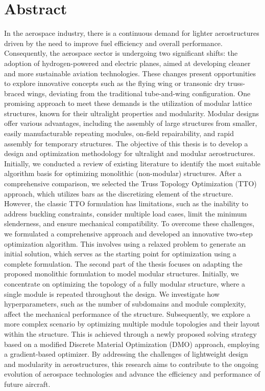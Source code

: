 \chapter*{Abstract}
{}%
%
In the aerospace industry, there is a continuous demand for lighter aerostructures driven by the need to improve fuel efficiency and overall performance. Consequently, the aerospace sector is undergoing two significant shifts: the adoption of hydrogen-powered and electric planes, aimed at developing cleaner and more sustainable aviation technologies. These changes present opportunities to explore innovative concepts such as the flying wing or transonic dry truss-braced wings, deviating from the traditional tube-and-wing configuration. One promising approach to meet these demands is the utilization of modular lattice structures, known for their ultralight properties and modularity. Modular designs offer various advantages, including the assembly of large structures from smaller, easily manufacturable repeating modules, on-field repairability, and rapid assembly for temporary structures.
The objective of this thesis is to develop a design and optimization methodology for ultralight and modular aerostructures. Initially, we conducted a review of existing literature to identify the most suitable algorithm basis for optimizing monolithic (non-modular) structures. After a comprehensive comparison, we selected the Truss Topology Optimization (TTO) approach, which utilizes bars as the discretizing element of the structure. However, the classic TTO formulation has limitations, such as the inability to address buckling constraints, consider multiple load cases, limit the minimum slenderness, and ensure mechanical compatibility. To overcome these challenges, we formulated a comprehensive approach and developed an innovative two-step optimization algorithm. This involves using a relaxed problem to generate an initial solution, which serves as the starting point for optimization using a complete formulation.
The second part of the thesis focuses on adapting the proposed monolithic formulation to model modular structures. Initially, we concentrate on optimizing the topology of a fully modular structure, where a single module is repeated throughout the design. We investigate how hyperparameters, such as the number of subdomains and module complexity, affect the mechanical performance of the structure. Subsequently, we explore a more complex scenario by optimizing multiple module topologies and their layout within the structure. This is achieved through a newly proposed solving strategy based on a modified Discrete Material Optimization (DMO) approach, employing a gradient-based optimizer.
By addressing the challenges of lightweight design and modularity in aerostructures, this research aims to contribute to the ongoing evolution of aerospace technologies and advance the efficiency and performance of future aircraft.

